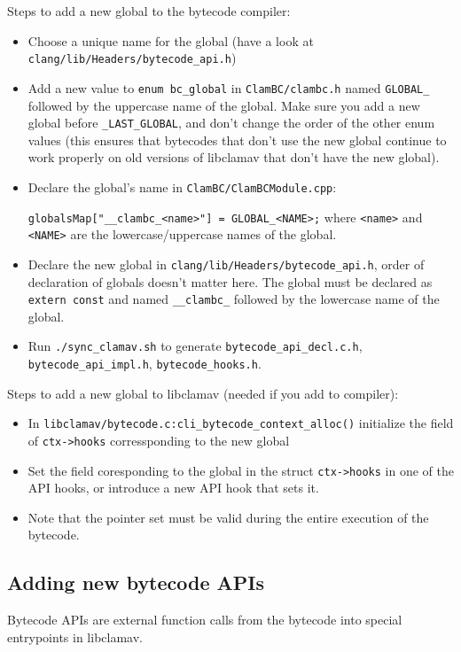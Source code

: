 Steps to add a new global to the bytecode compiler:
\begin{itemize}
\item Choose a unique name for the global
(have a look at \verb+clang/lib/Headers/bytecode_api.h+)

\item Add a new value to \verb+enum bc_global+ in \verb+ClamBC/clambc.h+ named
\verb+GLOBAL_+ followed by the uppercase name of the global. Make sure you add a
new global before \verb+_LAST_GLOBAL+, and don't change the order of the other
enum values (this ensures that bytecodes that don't use the new global continue
to work properly on old versions of libclamav that don't have the new global).

\item Declare the global's name in \verb+ClamBC/ClamBCModule.cpp+: 
 
\verb+globalsMap["__clambc_<name>"] = GLOBAL_<NAME>;+ where \verb+<name>+
and \verb+<NAME>+ are the lowercase/uppercase names of the global.

\item Declare the new global in \verb+clang/lib/Headers/bytecode_api.h+, order
of declaration  of globals doesn't matter here. The global must be declared as
\verb+extern const+ and named \verb+__clambc_+ followed by the lowercase name of
the global.

\item Run \verb+./sync_clamav.sh+ to generate \verb+bytecode_api_decl.c.h+,
\verb+bytecode_api_impl.h+, \verb+bytecode_hooks.h+.
\end{itemize}

Steps to add a new global to libclamav (needed if you add to compiler):
\begin{itemize}
\item In \verb+libclamav/bytecode.c:cli_bytecode_context_alloc()+ initialize the
field of \verb+ctx->hooks+ corressponding to the new global
\item Set the field coresponding to the global in the struct \verb+ctx->hooks+
in one of the API hooks, or introduce a new API hook that sets it.
\item Note that the pointer set must be valid during the entire execution of the
bytecode.
\end{itemize}

\subsection{Adding new bytecode APIs}
Bytecode APIs are external function calls from the bytecode into special
entrypoints in libclamav.

